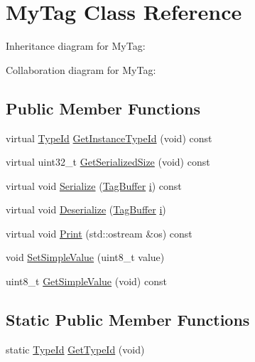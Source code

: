 \hypertarget{classMyTag}{}\section{My\+Tag Class Reference}
\label{classMyTag}


Inheritance diagram for My\+Tag\+:


Collaboration diagram for My\+Tag\+:
\subsection*{Public Member Functions}
\begin{DoxyCompactItemize}
\item 
virtual \hyperlink{classns3_1_1TypeId}{Type\+Id} \hyperlink{classMyTag_a0127a843363b6d492d5045741c67f385}{Get\+Instance\+Type\+Id} (void) const 
\item 
virtual uint32\+\_\+t \hyperlink{classMyTag_a2b3f0e0659c5c1cc54dce574844e1ad6}{Get\+Serialized\+Size} (void) const 
\item 
virtual void \hyperlink{classMyTag_a97ed38c2e127611f4576ef7f194c30e5}{Serialize} (\hyperlink{classns3_1_1TagBuffer}{Tag\+Buffer} \hyperlink{lte__uplink__power__control_8m_a6f6ccfcf58b31cb6412107d9d5281426}{i}) const 
\item 
virtual void \hyperlink{classMyTag_af4a0d71d8ab9ce5eff335cdc5fe69f91}{Deserialize} (\hyperlink{classns3_1_1TagBuffer}{Tag\+Buffer} \hyperlink{lte__uplink__power__control_8m_a6f6ccfcf58b31cb6412107d9d5281426}{i})
\item 
virtual void \hyperlink{classMyTag_a235f41be0e13c24bc7fb25a909571745}{Print} (std\+::ostream \&os) const 
\item 
void \hyperlink{classMyTag_a662c03c129cbd44b5cb29c63f518dcdd}{Set\+Simple\+Value} (uint8\+\_\+t value)
\item 
uint8\+\_\+t \hyperlink{classMyTag_a353be1fb83a0fa6728ab5d1924585efb}{Get\+Simple\+Value} (void) const 
\end{DoxyCompactItemize}
\subsection*{Static Public Member Functions}
\begin{DoxyCompactItemize}
\item 
static \hyperlink{classns3_1_1TypeId}{Type\+Id} \hyperlink{classMyTag_a57caf056caa83d5de995b1516566cf59}{Get\+Type\+Id} (void)
\end{DoxyCompactItemize}
